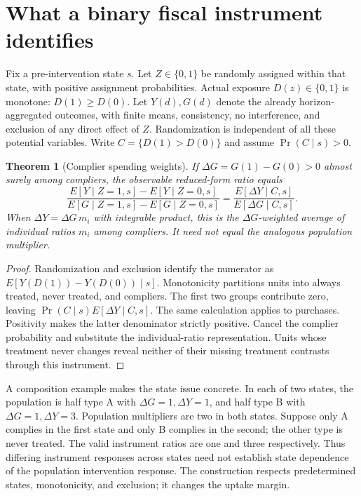 \documentclass[11pt]{article}
\newtheorem{theorem}{Theorem}
\theoremstyle{definition}
\begin{document}
\section*{What a binary fiscal instrument identifies}
Fix a pre-intervention state $s$. Let $Z\in\{0,1\}$ be randomly assigned within that state, with positive assignment probabilities. Actual exposure $D(z)\in\{0,1\}$ is monotone: $D(1)\ge D(0)$. Let $Y(d),G(d)$ denote the already horizon-aggregated outcomes, with finite means, consistency, no interference, and exclusion of any direct effect of $Z$. Randomization is independent of all these potential variables. Write $C=\{D(1)>D(0)\}$ and assume $\Pr(C\mid s)>0$.

\begin{theorem}[Complier spending weights]
If $\Delta G=G(1)-G(0)>0$ almost surely among compliers, the observable reduced-form ratio equals
\[
 \frac{E[Y\mid Z=1,s]-E[Y\mid Z=0,s]}
 {E[G\mid Z=1,s]-E[G\mid Z=0,s]}
 =\frac{E[\Delta Y\mid C,s]}{E[\Delta G\mid C,s]}.
 \tag{2}
\]
When $\Delta Y=\Delta G\,m_i$ with integrable product, this is the $\Delta G$-weighted average of individual ratios $m_i$ among compliers. It need not equal the analogous population multiplier.
\end{theorem}
\begin{proof}
Randomization and exclusion identify the numerator as $E[Y(D(1))-Y(D(0))\mid s]$. Monotonicity partitions units into always treated, never treated, and compliers. The first two groups contribute zero, leaving $\Pr(C\mid s)E[\Delta Y\mid C,s]$. The same calculation applies to purchases. Positivity makes the latter denominator strictly positive. Cancel the complier probability and substitute the individual-ratio representation. Units whose treatment never changes reveal neither of their missing treatment contrasts through this instrument.
\end{proof}

A composition example makes the state issue concrete. In each of two states, the population is half type A with $\Delta G=1,\Delta Y=1$, and half type B with $\Delta G=1,\Delta Y=3$. Population multipliers are two in both states. Suppose only A complies in the first state and only B complies in the second; the other type is never treated. The valid instrument ratios are one and three respectively. Thus differing instrument responses across states need not establish state dependence of the population intervention response. The construction respects predetermined states, monotonicity, and exclusion; it changes the uptake margin.
\end{document}
